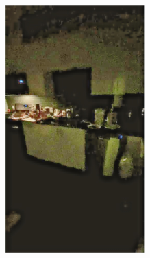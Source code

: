 \documentclass[letterpaper,12pt]{article}
\begin{document}
\begin{figure}[htbp]
\begin{subfigure}{0.128\textwidth}
			\includegraphics[width=\linewidth]{LoLi-Phone-imgT/TBEFN}
			\captionsetup{font=scriptsize}
			\caption{}
			\label{fig: LoLi-Phone-imgT_h}  
		\end{subfigure}
		\begin{subfigure}{0.128\textwidth}

\end{subfigure}
\end{figure}
\end{document}
